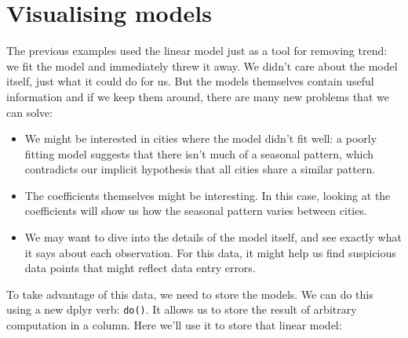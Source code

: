 \section{Visualising models}\label{sub:modelvis}

The previous examples used the linear model just as a tool for removing
trend: we fit the model and immediately threw it away. We didn't care
about the model itself, just what it could do for us. But the models
themselves contain useful information and if we keep them around, there
are many new problems that we can solve:

\begin{itemize}
\item
  We might be interested in cities where the model didn't fit well: a
  poorly fitting model suggests that there isn't much of a seasonal
  pattern, which contradicts our implicit hypothesis that all cities
  share a similar pattern.
\item
  The coefficients themselves might be interesting. In this case,
  looking at the coefficients will show us how the seasonal pattern
  varies between cities.
\item
  We may want to dive into the details of the model itself, and see
  exactly what it says about each observation. For this data, it might
  help us find suspicious data points that might reflect data entry
  errors.
\end{itemize}

To take advantage of this data, we need to store the models. We can do
this using a new dplyr verb: \texttt{do()}. It allows us to store the
result of arbitrary computation in a column. Here we'll use it to store
that linear model: 

\begin{Shaded}
\end{Shaded}

